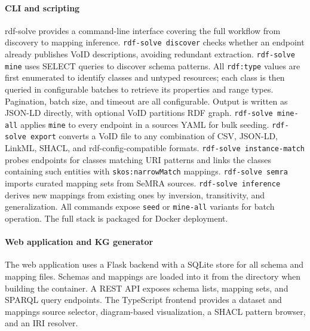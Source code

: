 \documentclass[12pt]{article}
\begin{document}
\paragraph{CLI and scripting}
rdf-solve provides a command-line interface covering the full workflow from discovery
to mapping inference. \texttt{rdf-solve discover} checks whether an endpoint already
publishes VoID descriptions, avoiding redundant extraction. 
\texttt{rdf-solve mine} uses SELECT queries to discover schema patterns. All 
\texttt{rdf:type} values are first enumerated to identify classes and untyped resources;
each class is then queried in configurable batches to retrieve its properties and range
types. Pagination, batch size, and timeout are all configurable. Output is written as
JSON-LD directly, with optional VoID partitions RDF graph.
\texttt{rdf-solve mine-all} applies \texttt{mine} to every endpoint in a sources YAML
for bulk seeding. \texttt{rdf-solve export} converts a VoID file to any combination
of CSV, JSON-LD, LinkML, SHACL, and rdf-config-compatible formats. \texttt{rdf-solve
instance-match} probes endpoints for classes matching URI patterns and
links the classes containing such entities with  \texttt{skos:narrowMatch} mappings.         %
\texttt{rdf-solve semra} imports curated mapping sets from SeMRA sources.  %
\texttt{rdf-solve inference} derives new mappings from existing ones by inversion, 
transitivity, and generalization. All commands expose \texttt{seed} or \texttt{mine-all} 
variants for batch operation. The full stack is packaged for Docker deployment.

\paragraph{Web application and KG generator}
The web application uses a Flask backend with a SQLite store for all schema and mapping files. Schemas and mappings are  
loaded into it from the directory when building the container. A REST API exposes schema lists, mapping sets, and
SPARQL query endpoints. The TypeScript frontend provides a dataset and mappings source selector,  
diagram-based visualization, a SHACL pattern browser, and an IRI resolver. 
\end{document}
